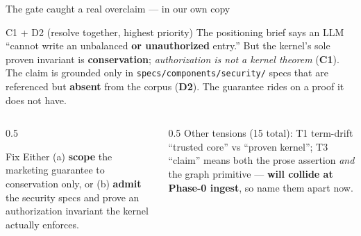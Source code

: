 \documentclass[aspectratio=169,11pt]{beamer}
\begin{document}
\begin{frame}{The gate caught a real overclaim --- in our own copy}
  \begin{block}{C1 + D2 (resolve together, highest priority)}
    \footnotesize
    The positioning brief says an LLM ``cannot write an unbalanced \textbf{or unauthorized} entry.''
    But the kernel's sole proven invariant is \textbf{conservation}; \emph{authorization is not a kernel theorem}
    (\textbf{C1}). The claim is grounded only in \texttt{specs/components/security/} specs that are referenced
    but \textbf{absent} from the corpus (\textbf{D2}). The guarantee rides on a proof it does not have.
  \end{block}
  \vskip2pt
  \begin{columns}[T]
    \begin{column}{0.5\textwidth}
      \begin{block}{Fix}
        \footnotesize Either (a) \textbf{scope} the marketing guarantee to conservation only, or (b) \textbf{admit} the security specs and prove an authorization invariant the kernel actually enforces.
      \end{block}
    \end{column}
    \begin{column}{0.5\textwidth}
      {\footnotesize Other tensions (15 total): T1 term-drift ``trusted core'' vs ``proven kernel''; T3 ``claim'' means both the prose assertion \emph{and} the graph primitive --- \textbf{will collide at Phase-0 ingest}, so name them apart now.}
    \end{column}
  \end{columns}
\end{frame}
\end{document}
